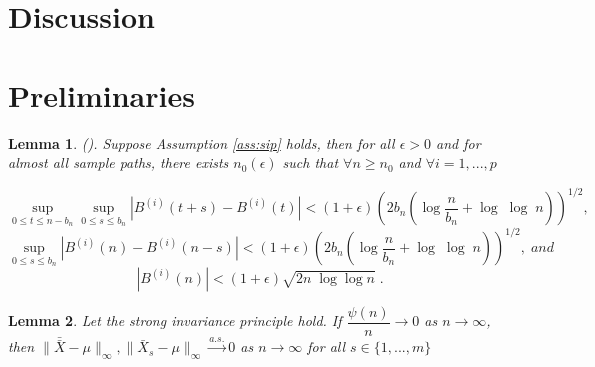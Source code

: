 \documentclass[11pt]{article}
\newtheorem{lemma}{Lemma}
\theoremstyle{remark}
\begin{document}
\section{Discussion} \label{sec:discussion}


\appendix

\section{Preliminaries} \label{apdx:preliminaries}

\begin{lemma}
\label{lemma: brownian}
(\cite{csorgo2014strong}). Suppose Assumption \ref{ass:sip} holds, then for all $\epsilon > 0$ and for almost all sample paths, there exists $n_{0}\left(\epsilon\right)$ such that $\forall n\geq n_{0}$ and $\forall i = 1, ..., p$

\[
\sup_{0\leq t \leq n-b_n}\sup_{0 \leq s \leq b_n} \left| B^{\left(i\right)}\left(t+s\right) - B^{\left(i\right)}\left(t\right) \right| < \left(1+ \epsilon\right)\left(2b_n\left(\log\dfrac{n}{b_n} + \log\; \log\; n\right)\right)^{1/2} ,
\]
%
\[
\sup_{0 \leq s \leq b_n} \left|B^{\left(i\right)}\left(n\right) - B^{\left(i\right)}\left(n - s\right)\right| < \left(1+ \epsilon\right)\left(2b_n\left(\log\dfrac{n}{b_n} + \log\;\log\;n\right)\right)^{1/2} , \;and
\]
%
\[
\left|B^{\left(i\right)}\left(n\right)\right| < \left(1+\epsilon\right)\sqrt{2n\;\log \log n} \; . 
\]
\end{lemma}


\begin{lemma} \label{lemma:consis_1}
  Let the strong invariance principle hold. If $\dfrac{\psi(n)}{n} \to 0$ as $n \to \infty$, then $\| \bar{\bar{X}} - \mu\|_{\infty}, \|\bar{X}_s - \mu\|_{\infty} \xrightarrow[]{a.s.} 0$ as $n \to \infty$ for all $s \in \{1,..., m\}$\\
  \end{lemma}
\end{document}
